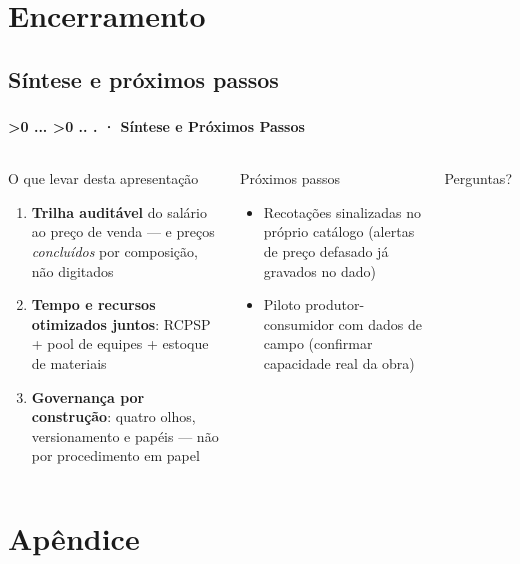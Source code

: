 \documentclass[aspectratio=169,10pt]{beamer}
\newcounter{mlc3}[subsection]
\newcounter{mlc4}[mlc3]
\newcommand{\pathnum}{%
  \ifnum\value{mlc4}>0
    \thesection.\thesubsection.\arabic{mlc3}.\arabic{mlc4}%
  \else\ifnum\value{mlc3}>0
    \thesection.\thesubsection.\arabic{mlc3}%
  \else
    \thesection.\thesubsection%
  \fi\fi
}
\newcommand{\mtitle}[1]{%
  \frametitle{\insertsection}%
  \framesubtitle{\pathnum\;·\; #1}}
\begin{document}
\section{Encerramento}

\subsection{Síntese e próximos passos}
\begin{frame}
  \mtitle{Síntese e Próximos Passos}
  \begin{columns}[T]
    \begin{block}{O que levar desta apresentação}
      \begin{enumerate}\small
        \item \textbf{Trilha auditável} do salário ao preço de venda ---
          e preços \emph{concluídos} por composição, não digitados
        \item \textbf{Tempo e recursos otimizados juntos}: RCPSP + pool
          de equipes + estoque de materiais
        \item \textbf{Governança por construção}: quatro olhos,
          versionamento e papéis --- não por procedimento em papel
      \end{enumerate}
    \end{block}
    \begin{block}{Próximos passos}
      \begin{itemize}\scriptsize
        \item Recotações sinalizadas no próprio catálogo
          (alertas de preço defasado já gravados no dado)
        \item Piloto produtor-consumidor com dados de campo
          (confirmar capacidade real da obra)
      \end{itemize}
    \end{block}
    \vspace{6pt}
    \begin{exampleblock}{}
      \centering\large Perguntas?
    \end{exampleblock}
  \end{columns}
\end{frame}


\appendix
\section{Apêndice}
\end{document}
